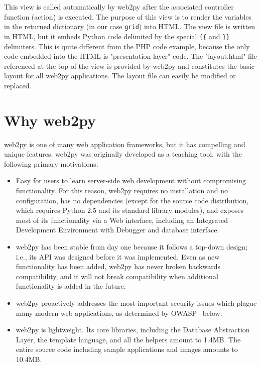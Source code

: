 \documentclass[justified,sixbynine,notoc]{tufte-book}
\def\ft{\small\tt}
\begin{document}
\begin{fullwidth}
This view is called automatically by web2py after the associated controller function (action) is executed.
The purpose of this view is to render the variables in the returned dictionary (in our case {\ft grid}) into HTML.
The view file is written in HTML, but it embeds Python code delimited by the special {\ft \{\{} and {\ft \}\}}
delimiters. This is quite different from the PHP code example, because the only code
embedded into the HTML is "presentation layer" code. The "layout.html" file referenced at the top of the
view is provided by web2py and constitutes the basic layout for all web2py applications. The layout file can
easily be modified or replaced.

\goodbreak\section{Why web2py}
\noindent web2py is one of many web application frameworks, but it has compelling and unique features.
web2py was originally developed as a teaching tool, with the following primary motivations:
\begin{itemize}
\item Easy for users to learn server-side web development without compromising functionality. For this reason, web2py requires no installation and no configuration, has no dependencies (except for the source code distribution, which requires Python 2.5 and its standard library modules), and exposes most of its functionality via a Web interface, including an Integrated Development Environment with Debugger and database interface.

\item web2py has been stable from day one because it follows a top-down design; i.e., its API was designed before it was implemented. Even as new functionality has been added, web2py has never broken backwards compatibility, and it will not break compatibility when additional functionality is added in the future.

\item web2py proactively addresses the most important security issues which plague many modern web applications, as determined by OWASP~\cite{owasp}  below.

\item web2py is lightweight. Its core libraries, including the Database Abstraction Layer, the template language, and all the helpers amount to 1.4MB. The entire source code including sample applications and images amounts to 10.4MB.


\end{itemize}
\end{fullwidth}
\end{document}
